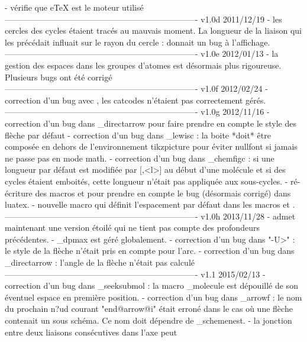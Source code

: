     - vérifie que eTeX est le moteur utilisé
----------------------------------------------------------------------
v1.0d      2011/12/19
    - les cercles des cycles étaient tracés au mauvais moment. La
      longueur de la liaison qui les précédait influait sur le
      rayon du cercle :  donnait un bug
      à l'affichage.
----------------------------------------------------------------------
v1.0e      2012/01/13
    - la gestion des espaces dans les groupes d'atomes est
      désormais plus rigoureuse. Plusieurs bugs ont été
      corrigé
----------------------------------------------------------------------
v1.0f      2012/02/24
    - correction d'un bug avec , les catcodes n'étaient
      pas correctement gérés.
----------------------------------------------------------------------
v1.0g      2012/11/16
    - correction d'un bug dans \CF_directarrow pour faire prendre en
      compte le style des flèche par défaut
    - correction d'un bug dans \CF_lewisc : la boite *doit* être
      composée en dehors de l'environnement tikzpicture pour
      éviter nullfont si jamais \printatom ne passe pas en mode
      math.
    - correction d'un bug dans \CF_chemfigc : si une longueur par
      défaut est modifiée par [,<l>] au début d'une molécule
      et si des cycles étaient emboités, cette longueur n'était
      pas appliquée aux sous-cycles.
    - ré-écriture des macros \chemabove et \chembemow pour
      prendre en compte le bug (désormais corrigé) dans luatex.
    - nouvelle macro \setstacksep qui définit l'espacement par
      défaut dans les macros \chemabove et \chembelow.
----------------------------------------------------------------------
v1.0h      2013/11/28
    - \chemname admet maintenant une version étoilé qui ne tient
      pas compte des profondeurs précédentes.
    - \CF_dpmax est géré globalement.
    - correction d'un bug dans "-U>" : le style de la flèche
      n'était pris en compte pour l'arc.
    - correction d'un bug dans \CF_directarrow : l'angle de la
      flèche n'était pas calculé
----------------------------------------------------------------------
v1.1       2015/02/13
    - correction d'un bug dans \CF_seeksubmol : la macro
      \CF_molecule est dépouillé de son éventuel espace
      en première position.
    - correction d'un bug dans \CF_arrowf : le nom du prochain
      n?ud courant "end@arrow@i" était erroné dans le cas où une
      flèche contenait un sous schéma. Ce nom doit dépendre de
      \CF_schemenest.
    - la jonction entre deux liaisons consécutives dans l'axe peut
